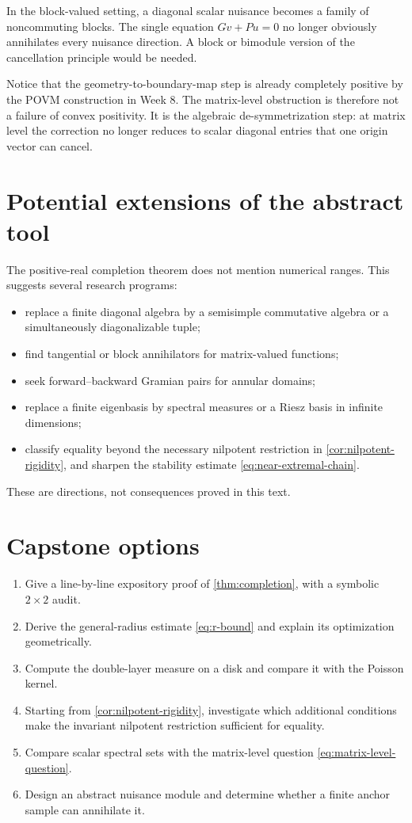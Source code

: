 \documentclass[11pt,oneside,openany]{book}
\theoremstyle{definition}
\theoremstyle{remark}
\begin{document}
In the block-valued setting, a diagonal scalar nuisance becomes a
family of noncommuting blocks.  The single equation \(Gv+Pu=0\) no
longer obviously annihilates every nuisance direction.  A block or
bimodule version of the cancellation principle would be needed.

Notice that the geometry-to-boundary-map step is already completely
positive by the POVM construction in Week 8.  The matrix-level
obstruction is therefore not a failure of convex positivity.  It is
the algebraic de-symmetrization step: at matrix level the correction
no longer reduces to scalar diagonal entries that one origin vector
can cancel.

\section{Potential extensions of the abstract tool}

The positive-real completion theorem does not mention numerical
ranges.  This suggests several research programs:
\begin{itemize}
  \item replace a finite diagonal algebra by a semisimple commutative
  algebra or a simultaneously diagonalizable tuple;
  \item find tangential or block annihilators for matrix-valued
  functions;
  \item seek forward--backward Gramian pairs for annular domains;
  \item replace a finite eigenbasis by spectral measures or a Riesz
  basis in infinite dimensions;
  \item classify equality beyond the necessary nilpotent restriction
  in \cref{cor:nilpotent-rigidity}, and sharpen the stability estimate
  \eqref{eq:near-extremal-chain}.
\end{itemize}
These are directions, not consequences proved in this text.

\section{Capstone options}

\begin{enumerate}
  \item Give a line-by-line expository proof of
  \cref{thm:completion}, with a symbolic \(2\times2\) audit.
  \item Derive the general-radius estimate
  \eqref{eq:r-bound} and explain its optimization geometrically.
  \item Compute the double-layer measure on a disk and compare it with
  the Poisson kernel.
  \item Starting from \cref{cor:nilpotent-rigidity}, investigate which
  additional conditions make the invariant nilpotent restriction
  sufficient for equality.
  \item Compare scalar spectral sets with the matrix-level question
  \eqref{eq:matrix-level-question}.
  \item Design an abstract nuisance module and determine whether a
  finite anchor sample can annihilate it.
\end{enumerate}
\end{document}
